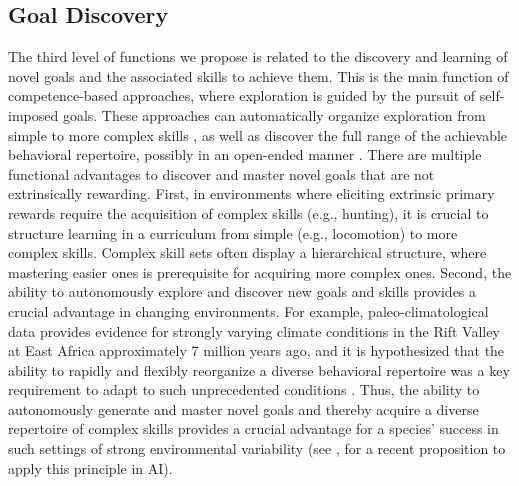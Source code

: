 \subsection{Goal Discovery}\label{CH3_SS_goal_discovery}
The third level of functions we propose is related to the discovery and learning of novel goals and the associated skills to achieve them. This is the main function of competence-based approaches, where exploration is guided by the pursuit of self-imposed goals. These approaches can automatically organize exploration from simple to more complex skills \parencite{forestier_intrinsically_2020,pong_skew-fit_2020}, as well as discover the full range of the achievable behavioral repertoire, possibly in an open-ended manner \parencite{colas_curious_2019}. There are multiple functional advantages to discover and master novel goals that are not extrinsically rewarding. First, in environments where eliciting extrinsic primary rewards require the acquisition of complex skills (e.g., hunting), it is crucial to structure learning in a curriculum from simple (e.g., locomotion) to more complex skills. Complex skill sets often display a hierarchical structure, where mastering easier ones is prerequisite for acquiring more complex ones. Second, the ability to autonomously explore and discover new goals and skills provides a crucial advantage in changing environments. For example, paleo-climatological data provides evidence for strongly varying climate conditions in the Rift Valley at East Africa approximately 7 million years ago, and it is hypothesized that the ability to rapidly and flexibly reorganize a diverse behavioral repertoire was a key requirement to adapt to such unprecedented conditions \parencite{potts_hominin_2013}. Thus, the ability to autonomously generate and master novel goals and thereby acquire a diverse repertoire of complex skills provides a crucial advantage for a species' success in such settings of strong environmental variability (see \cite{nisioti_grounding_2020}, for a recent proposition to apply this principle in AI).

